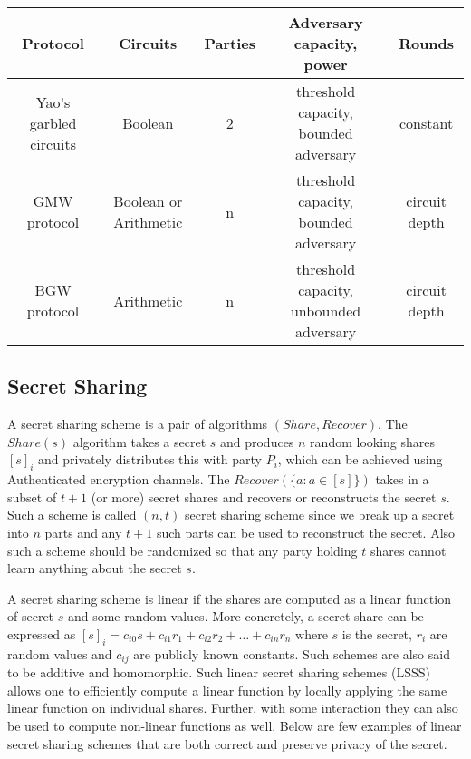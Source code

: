 \documentclass[11pt]{article}
\begin{document}
\begin{table}[ht]
    \begin{adjustbox}{width=1\textwidth,center=\textwidth}
    \begin{tabular}{|c|c|c|c|c|}
        \hline
        \textbf{Protocol} & \textbf{Circuits} & \textbf{Parties} & \textbf{Adversary capacity, power} & \textbf{Rounds} \\
        \hline
        Yao's garbled circuits & Boolean & 2 & threshold capacity, bounded adversary & constant \\
        \hline
        GMW protocol & Boolean or Arithmetic & n & threshold capacity, bounded adversary & circuit depth \\
        \hline
        BGW protocol & Arithmetic & n & threshold capacity, unbounded adversary & circuit depth \\
        \hline
    \end{tabular}
    \end{adjustbox}
\end{table}

\subsection*{Secret Sharing}

A secret sharing scheme is a pair of algorithms $(Share, Recover)$. The $Share(s)$ algorithm takes a secret $s$ and produces $n$ random looking shares $[s]_i$ and privately distributes this with party $P_i$, which can be achieved using Authenticated encryption channels. The $Recover(\{a : a \in [s]\})$ takes in a subset of $t+1$ (or more) secret shares and recovers or reconstructs the secret $s$. Such a scheme is called $(n, t)$ secret sharing scheme since we break up a secret into $n$ parts and any $t+1$ such parts can be used to reconstruct the secret. Also such a scheme should be randomized so that any party holding $t$ shares cannot learn anything about the secret $s$.

A secret sharing scheme is linear if the shares are computed as a linear function of secret $s$ and some random values. More concretely, a secret share can be expressed as $[s]_i = c_{i0}s + c_{i1}r_1 + c_{i2}r_2 + \dots + c_{in}r_n$ where $s$ is the secret, $r_i$ are random values and $c_{ij}$ are publicly known constants. Such schemes are also said to be additive and homomorphic. Such linear secret sharing schemes (LSSS) allows one to efficiently compute a linear function by locally applying the same linear function on individual shares. Further, with some interaction they can also be used to compute non-linear functions as well. Below are few examples of linear secret sharing schemes that are both correct and preserve privacy of the secret.
\end{document}
